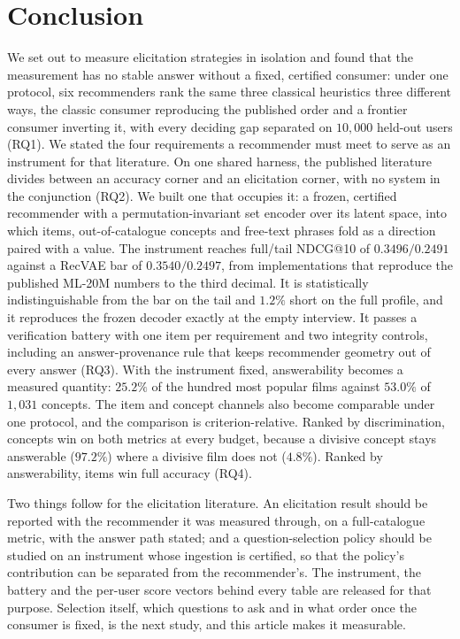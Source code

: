 \documentclass[manuscript,screen,review]{acmart}
\begin{document}
\section{Conclusion}\label{sec:conclusion}

We set out to measure elicitation strategies in isolation and found that the measurement has no stable answer without a fixed, certified consumer: under one protocol, six recommenders rank the same three classical heuristics three different ways, the classic consumer reproducing the published order and a frontier consumer inverting it, with every deciding gap separated on $10{,}000$ held-out users (RQ1). We stated the four requirements a recommender must meet to serve as an instrument for that literature. On one shared harness, the published literature divides between an accuracy corner and an elicitation corner, with no system in the conjunction (RQ2). We built one that occupies it: a frozen, certified recommender with a permutation-invariant set encoder over its latent space, into which items, out-of-catalogue concepts and free-text phrases fold as a direction paired with a value. The instrument reaches full/tail NDCG@10 of $0.3496/0.2491$ against a RecVAE bar of $0.3540/0.2497$, from implementations that reproduce the published ML-20M numbers to the third decimal. It is statistically indistinguishable from the bar on the tail and $1.2\%$ short on the full profile, and it reproduces the frozen decoder exactly at the empty interview. It passes a verification battery with one item per requirement and two integrity controls, including an answer-provenance rule that keeps recommender geometry out of every answer (RQ3). With the instrument fixed, answerability becomes a measured quantity: $25.2\%$ of the hundred most popular films against $53.0\%$ of $1{,}031$ concepts. The item and concept channels also become comparable under one protocol, and the comparison is criterion-relative. Ranked by discrimination, concepts win on both metrics at every budget, because a divisive concept stays answerable ($97.2\%$) where a divisive film does not ($4.8\%$). Ranked by answerability, items win full accuracy (RQ4).

Two things follow for the elicitation literature. An elicitation result should be reported with the recommender it was measured through, on a full-catalogue metric, with the answer path stated; and a question-selection policy should be studied on an instrument whose ingestion is certified, so that the policy's contribution can be separated from the recommender's. The instrument, the battery and the per-user score vectors behind every table are released for that purpose. Selection itself, which questions to ask and in what order once the consumer is fixed, is the next study, and this article makes it measurable.
\end{document}
